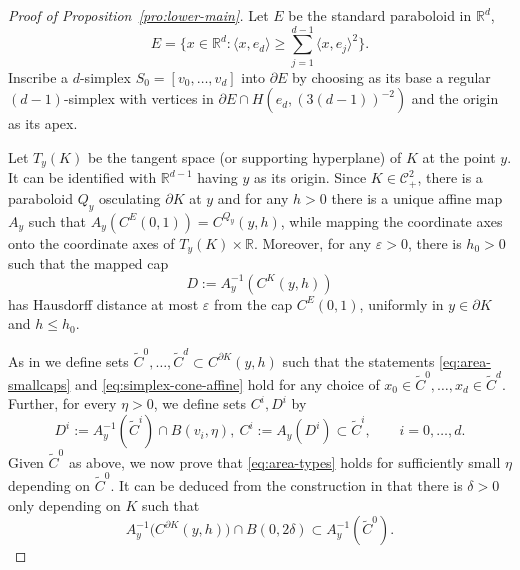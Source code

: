 \documentclass[12pt]{article}
\newcommand{\IR}{\mathds{R}}
\def\cC{{\mathcal C}}
\def\bd{{\partial}}
\theoremstyle{definition}
\begin{document}
\begin{proof}[Proof of Proposition~\ref{pro:lower-main}]
Let $E$ be the standard paraboloid in $\IR^d$,
\[
E=\bigg\{x\in \IR^d\colon  \langle x,e_d\rangle \ge \sum_{j=1}^{d-1}\langle x,e_j\rangle^2\bigg\}.
\]
Inscribe a $d$-simplex $S_0=[v_0,\dots,v_d]$ into $\partial E$ by choosing as its base a regular $(d-1)$-simplex with vertices in $\partial E\cap H(e_d,(3(d-1))^{-2})$ and the origin as its apex. 

Let $T_y(K)$ be the tangent space (or supporting hyperplane) of $K$ at the point $y$. It can be identified with $\IR^{d-1}$ having $y$ as its origin. Since $K\in \cC^2_+$, there is a paraboloid $Q_y$ osculating $\bd K$ at $y$ and for any $h>0$ there is a unique affine map $A_y$ such that $A_y(C^{E}(0,1))=C^{Q_y}(y,h)$, while mapping the coordinate axes onto the coordinate axes of $T_y(K)\times \IR$. Moreover, for any $\varepsilon>0$, there is $h_0>0$ such that the mapped cap 
\[
D:=A_y^{-1}(C^{K}(y,h))
\]
has Hausdorff distance at most $\varepsilon$ from the cap $C^{E}(0,1)$, uniformly in $y\in \partial K$ and $h\le h_0$.

As in \cite{TuWe} we define sets $\tilde C^0,\dots,\tilde C^d\subset C^{\partial K}(y,h)$ such that the statements \eqref{eq:area-smallcaps} and \eqref{eq:simplex-cone-affine} hold for any choice of $x_0\in \tilde C^0,\dots,x_d\in \tilde C^d$. Further, for every $\eta>0$, we define sets $C^i, D^i$ by
\begin{equation} \label{eq:eta}
D^i:=A_y^{-1}(\tilde C^i) \cap B(v_i,\eta)
,\
C^i:=A_y(D^i) \subset \tilde C^i,\qquad i=0,\dots,d.
\end{equation}
Given $\tilde{C}^0$ as above, we now prove that \eqref{eq:area-types} holds for sufficiently small $\eta$ depending on $\tilde{C}^0$. It can be deduced from the construction in \cite{TuWe} that there is $\delta>0$ only depending on $K$ such that
\begin{equation} \label{eq:ball-C0}
A_y^{-1}\big(C^{\partial K}(y,h)\big)\cap B(0,2\delta)\subset A_{y}^{-1}(\tilde{C}^0).
\end{equation}



\end{proof}
\end{document}
